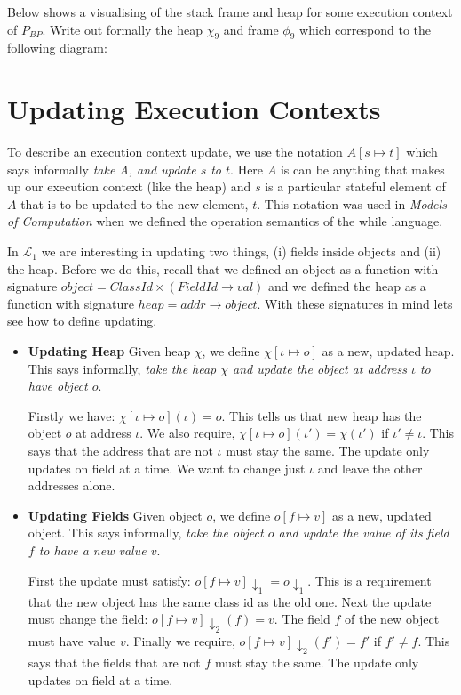 \begin{example}
Below shows a visualising of the stack frame and heap for 
some execution context of $P_{BP}$.
Write out formally the heap $\chi_9$ and frame $\phi_9$ 
which correspond to the following diagram:

\end{example}


\frmrule



\section{Updating Execution Contexts}

To describe an execution context update, we use the notation 
$A[s \mapsto t]$ which says informally \textit{take A, and update
$s$ to $t$}. Here $A$ is can be anything that makes up our execution context 
(like the heap) and $s$ is a particular stateful element of $A$ that is to be 
updated to the new element, $t$. This notation was used in 
\textit{Models of Computation} when we defined the operation semantics of the 
while language.

In $\mathcal{L}_1$ we are interesting in updating two things, (i) fields inside objects and 
(ii) the heap. Before we do this, recall that we defined an object as a 
function with signature $object = ClassId \times (FieldId \rightarrow val)$ 
and we defined the heap as a function with signature
$heap = addr \rightarrow object$. With these signatures in mind lets see 
how to define updating.

\begin{itemize}   
\renewcommand{\labelitemi}{$\Box$}
\item \textbf{Updating Heap}
Given heap $\chi$, we define $\chi[\iota \mapsto o]$ as a new, updated heap.
This says informally, \textit{take the heap $\chi$ and update the 
object at address $\iota$ to have object $o$}.

Firstly we have: $\chi[\iota \mapsto o](\iota) = o$. 
This tells us that new heap has the object $o$ at address $\iota$.
We also require, $\chi[\iota \mapsto o](\iota') = \chi(\iota')$ if $\iota' \neq \iota$. 
This says that the address that are not $\iota$ must stay the same.
The update only updates on field at a time. We want to change just $\iota$ and leave 
the other addresses alone.
\item \textbf{Updating Fields} 
Given object $o$, we define $o[f \mapsto v]$ as a new, updated object.
This says informally, \textit{take the object $o$ and update the 
value of its field $f$ to have a new value $v$}.

First the update must satisfy: $o[f \mapsto v] \downarrow_1 = o \downarrow_1$. 
This is a requirement that the new object has the same class id as the old one.
Next the update must change the field: $o[f \mapsto v] \downarrow_2 (f) = v$.
The field $f$ of the new object must have value $v$. 
Finally we require, $o[f \mapsto v] \downarrow_2 (f') = f'$ if $f' \neq f$. 
This says that the fields that are not $f$ must stay the same.
The update only updates on field at a time.
\end{itemize}

